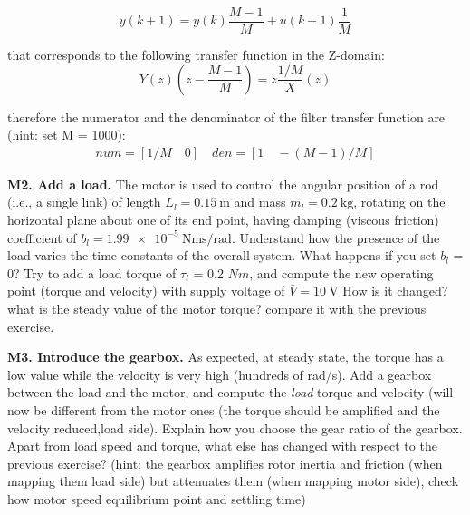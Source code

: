\documentclass[11pt]{article}
\begin{document}
\begin{equation}
y(k+1) = y(k)\frac{M-1}{M} + u(k+1)\frac{1}{M}
\end{equation}

that corresponds to the following transfer function in the Z-domain:
\begin{equation}
Y(z)\left( z - \frac{M-1}{M} \right) = z \frac{1/M} X(z)
\end{equation}

therefore the numerator and the denominator of the filter transfer function are (hint: set M = 1000):
\begin{align}
num = [1/M \quad 0] \quad den = [1 \quad -(M-1)/M]
\end{align}

\textbf{M2. Add a load.} The motor is used to control the angular position of a rod (i.e., a single link) 
of length $L_l = 0.15 \ \mathrm{m}$ and mass $m_l = 0.2 \ \mathrm{kg}$, 
rotating on the horizontal plane about one of its end point, having damping (viscous friction) 
coefficient of $b_l = \num{1.99e-5} \ \mathrm{Nms/rad}$. 
Understand how the presence of the load varies the time constants of the overall system. 
What happens if you set $b_l$ = 0?  %
Try to add a load torque of $\tau_l$ = 0.2 $Nm$, and compute the new operating point (torque and velocity) with  supply voltage of $\bar{V} = 10 \ \mathrm{V}$ How is it changed? what is the steady value of the motor torque? compare it with the previous exercise.

%
\par
\textbf{M3. Introduce the gearbox.} As expected, at steady state, the torque has a low value while the velocity is very high (hundreds of rad/s). 
Add a gearbox between the load and the motor, and compute the \textit{load} torque and velocity (will now be different from the motor ones (the torque should be amplified  and the velocity reduced,load side). Explain how you choose the gear ratio of the gearbox.
Apart from load speed and torque, what else has changed with respect to the previous exercise? (hint: the gearbox amplifies rotor inertia and friction (when mapping them load side) but attenuates them (when mapping motor side), check how motor speed equilibrium point and settling time)
\end{document}
